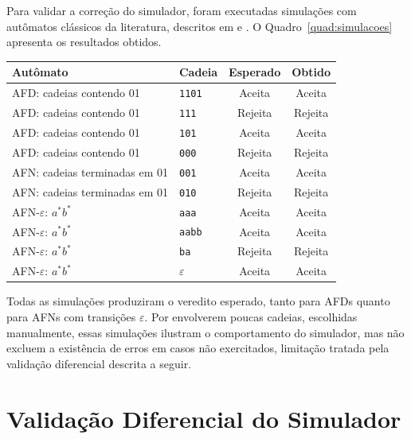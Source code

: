 \documentclass[
    12pt
    ,oneside
    ,a4paper
    ,chapter=TITLE
    ,section=TITLE
    ,sumario=abnt-6027-2012]{abntex2}
\begin{document}
Para validar a correção do simulador, foram executadas simulações com autômatos
clássicos da literatura, descritos em  e
. O Quadro~\ref{quad:simulacoes} apresenta os resultados obtidos.

\begin{quadro}[h]
    \centering
    \caption{SIMULAÇÕES REALIZADAS COM AUTÔMATOS CLÁSSICOS}
    \label{quad:simulacoes}
    \small
    \begin{tabular}{|l|l|c|c|}
        \hline
        \textbf{Autômato} & \textbf{Cadeia} & \textbf{Esperado} & \textbf{Obtido} \\
        \hline
        AFD: cadeias contendo 01 & \texttt{1101} & Aceita  & Aceita \\
        AFD: cadeias contendo 01 & \texttt{111}  & Rejeita & Rejeita \\
        AFD: cadeias contendo 01 & \texttt{101}  & Aceita  & Aceita \\
        AFD: cadeias contendo 01 & \texttt{000}  & Rejeita & Rejeita \\
        AFN: cadeias terminadas em 01 & \texttt{001} & Aceita & Aceita \\
        AFN: cadeias terminadas em 01 & \texttt{010} & Rejeita & Rejeita \\
        AFN-$\varepsilon$: $a^*b^*$ & \texttt{aaa} & Aceita & Aceita \\
        AFN-$\varepsilon$: $a^*b^*$ & \texttt{aabb} & Aceita & Aceita \\
        AFN-$\varepsilon$: $a^*b^*$ & \texttt{ba} & Rejeita & Rejeita \\
        AFN-$\varepsilon$: $a^*b^*$ & $\varepsilon$ & Aceita & Aceita \\
        \hline
    \end{tabular}
\end{quadro}

Todas as simulações produziram o veredito esperado, tanto para AFDs quanto para AFNs com
transições $\varepsilon$. Por envolverem poucas cadeias, escolhidas manualmente, essas
simulações ilustram o comportamento do simulador, mas não excluem a existência de erros em
casos não exercitados, limitação tratada pela validação diferencial descrita a seguir.

\section{Validação Diferencial do Simulador}
\label{sec:res-diferencial}
\end{document}
